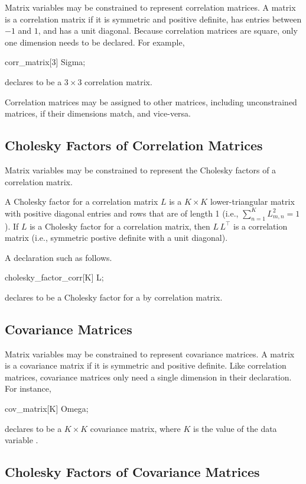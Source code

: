 Matrix variables may be constrained to represent correlation matrices.
A matrix is a correlation matrix if it is symmetric and positive
definite, has entries between $-1$ and $1$, and has a unit diagonal.
Because correlation matrices are square, only one dimension needs
to be declared.  For example,
%
\begin{stancode}
corr_matrix[3] Sigma;
\end{stancode}
%
declares  to be a $3 \times 3$ correlation matrix.

Correlation matrices may be assigned to other matrices, including
unconstrained matrices, if their dimensions match, and vice-versa.

\subsection{Cholesky Factors of Correlation Matrices}

Matrix variables may be constrained to represent the Cholesky factors
of a correlation matrix.

A Cholesky factor for a correlation matrix $L$ is a $K \times K$
lower-triangular matrix with positive diagonal entries and rows that
are of length 1 (i.e., $\sum_{n=1}^K L_{m,n}^2 = 1$).  If $L$ is a
Cholesky factor for a correlation matrix, then $L\,L^{\top}$ is a
correlation matrix (i.e., symmetric postive definite with a unit
diagonal).

A declaration such as
follows.
%
\begin{stancode}
cholesky_factor_corr[K] L;
\end{stancode}
%
declares  to be a Cholesky factor for a  by 
correlation matrix.

\subsection{Covariance Matrices}

Matrix variables may be constrained to represent covariance matrices.
A matrix is a covariance matrix if it is symmetric and positive
definite.  Like correlation matrices, covariance matrices only need a
single dimension in their declaration.  For instance,
%
\begin{stancode}
cov_matrix[K] Omega;
\end{stancode}
%
declares  to be a $K \times K$ covariance matrix, where
$K$ is the value of the data variable .

\subsection{Cholesky Factors of Covariance Matrices}

